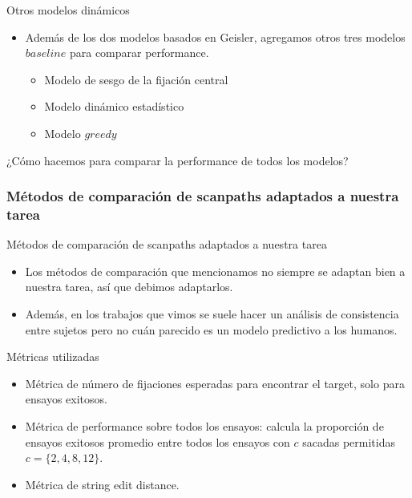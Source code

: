 \documentclass[compress]{beamer}
\begin{document}
\begin{frame}{Otros modelos dinámicos}
\begin{itemize}
\item Además de los dos modelos basados en Geisler, agregamos otros tres modelos $baseline$ para comparar performance.
\begin{itemize}
\item Modelo de sesgo de la fijación central
\item Modelo dinámico estadístico
\item Modelo $greedy$
\end{itemize}
\end{itemize}

\bigskip
¿Cómo hacemos para comparar la performance de todos los modelos?

\end{frame}

\subsubsection{Métodos de comparación de scanpaths adaptados a nuestra tarea}
\begin{frame}{Métodos de comparación de scanpaths adaptados a nuestra tarea}

\begin{itemize}
\item Los métodos de comparación que mencionamos no siempre se adaptan bien a nuestra tarea, así que debimos adaptarlos.
\item Además, en los trabajos que vimos se suele hacer un análisis de consistencia entre sujetos pero no cuán parecido es un modelo predictivo a los humanos.
\end{itemize}
\end{frame}

\begin{frame}{Métricas utilizadas}
\begin{itemize}
\item Métrica de número de fijaciones esperadas para
encontrar el target, solo para ensayos exitosos.
\item Métrica de performance sobre todos los ensayos: calcula la proporción de ensayos exitosos promedio entre todos los ensayos con $c$ sacadas permitidas $c = \{2,4,8,12\}$.
\item Métrica de string edit distance.
\end{itemize}
\end{frame}
\end{document}
